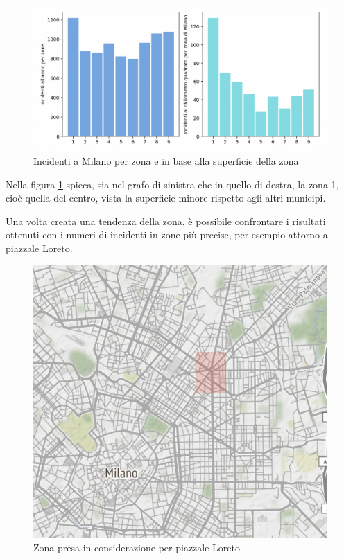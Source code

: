 \documentclass[a4paper]{report}
\begin{document}
\begin{figure}
    \includegraphics[width=\linewidth]{../src/municipi_milano/incidenti_superf.png}
    \caption{Incidenti a Milano per zona e in base alla superficie della zona}
    \label{fig:incidenti-chilometro}
\end{figure}

Nella figura \ref{fig:incidenti-chilometro} spicca, sia nel grafo di sinistra che in quello di destra, 
la zona 1, cioè quella del centro, vista la superficie minore rispetto agli altri municipi.

Una volta creata una tendenza della zona, è possibile confrontare i risultati ottenuti con i numeri 
di incidenti in zone più precise, per esempio attorno a piazzale Loreto.

\begin{figure}
    \includegraphics[width=\linewidth]{../src/municipi_milano/zona_loreto.png}
    \caption{Zona presa in considerazione per piazzale Loreto}
    \label{fig:zona-loreto}
\end{figure}
\end{document}
